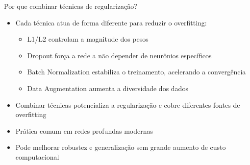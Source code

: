\documentclass{beamer}
\begin{document}
\begin{frame}{Por que combinar técnicas de regularização?}
\begin{itemize}
  \item Cada técnica atua de forma diferente para reduzir o overfitting:
  \begin{itemize}
    \item L1/L2 controlam a magnitude dos pesos
    \item Dropout força a rede a não depender de neurônios específicos
    \item Batch Normalization estabiliza o treinamento, acelerando a convergência
    \item Data Augmentation aumenta a diversidade dos dados
  \end{itemize}
  \item Combinar técnicas potencializa a regularização e cobre diferentes fontes de overfitting
  \item Prática comum em redes profundas modernas
  \item Pode melhorar robustez e generalização sem grande aumento de custo computacional
\end{itemize}
\end{frame}
\end{document}
